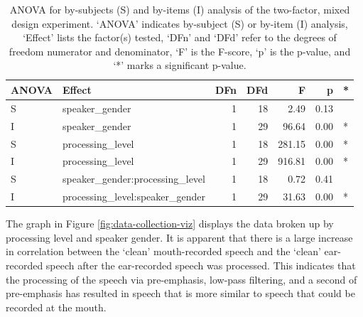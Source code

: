 \begin{table}[ht]
\centering
\begin{tabular}{llrrrrl}
  \hline
ANOVA & Effect & DFn & DFd & F & p & * \\ 
  \hline
S & speaker\_gender & 1 & 18 & 2.49 & 0.13 &  \\ 
  I & speaker\_gender & 1 & 29 & 96.64 & 0.00 & * \\ 
  S & processing\_level & 1 & 18 & 281.15 & 0.00 & * \\ 
  I & processing\_level & 1 & 29 & 916.81 & 0.00 & * \\ 
  S & speaker\_gender:processing\_level & 1 & 18 & 0.72 & 0.41 &  \\ 
  I & processing\_level:speaker\_gender & 1 & 29 & 31.63 & 0.00 & * \\ 
   \hline
\end{tabular}
\caption{ANOVA for by-subjects (S) and by-items (I) analysis of the two-factor, mixed design experiment. \DIFaddbeginFL {}\DIFaddendFL `ANOVA' indicates by-subject (S) or by-item (I) analysis, `Effect' lists the factor(s) tested, `DFn' and `DFd' refer to the degrees of freedom numerator and denominator, `F' is the F-score, `p' is the p-value, and `*' marks a significant p-value.} 
\label{tab:anova_data-collection}
\end{table}


\DIFdelbegin %


{%
}%

\DIFdelend The graph in Figure \ref{fig:data-collection-viz} displays the data broken up by processing level and speaker gender.  It is apparent that there is a large increase in correlation between the `clean' mouth-recorded speech and the `clean' ear-recorded speech after the ear-recorded speech was processed.  This indicates that the processing of the speech via pre-emphasis, low-pass filtering, and a second \DIFdelbegin {}\DIFdelend \DIFaddbegin {}\DIFaddend of pre-emphasis has resulted in speech that is more similar to speech that could be recorded at the mouth.

